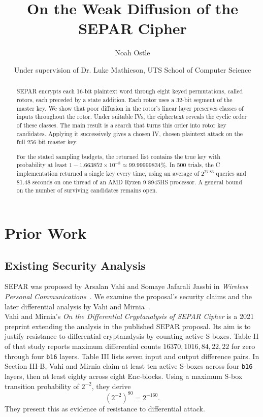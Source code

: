 \documentclass[11pt]{article}
\title{On the Weak Diffusion of the SEPAR Cipher}
\author{Noah Ostle}
\date{Under supervision of Dr. Luke Mathieson, UTS School of Computer Science}
\begin{document}
\maketitle
\begin{abstract}
	
SEPAR encrypts each 16-bit plaintext word through eight keyed permutations,
called rotors, each preceded by a state addition. Each rotor uses a 32-bit
segment of the master key. We show that poor diffusion in the rotor's linear
layer preserves classes of inputs throughout the rotor. Under suitable IVs,
the ciphertext reveals the cyclic order of these classes. The main result
is a search that turns this order into rotor key candidates. Applying it
successively gives a chosen IV, chosen plaintext attack on the full 256-bit
master key.

For the stated sampling budgets, the returned list contains the true key
with probability at least
\(1-1.663852\times10^{-8}\approx99.99999834\%\). In 500 trials, the C
implementation returned a single key every time, using an average of
\(2^{27.83}\) queries and 81.48 seconds on one thread of an AMD Ryzen 9
8945HS processor. A general bound on the number of surviving candidates
remains open.
\end{abstract}

\newpage

\section{Prior Work}\label{sec:literature}
\subsection{Existing Security Analysis}
SEPAR was proposed by Arsalan Vahi and Somaye Jafarali Jassbi in
\emph{Wireless Personal Communications}~\cite{separ}. We examine the
proposal's security claims and the later differential analysis by Vahi
and Mirnia~\cite{separ-differential}.\\

Vahi and Mirnia's \emph{On the Differential Cryptanalysis of SEPAR
Cipher} is a 2021 preprint extending the analysis in the published SEPAR proposal.
Its aim is to justify resistance to differential cryptanalysis by
counting active S-boxes. Table II of that study reports maximum
differential counts \(16370,1016,84,22,22\) for zero through four
\texttt{b16} layers. Table III lists seven input and output difference
pairs. In Section III-B, Vahi and Mirnia claim at least ten active
S-boxes across four \texttt{b16} layers, then at least eighty across
eight Enc-blocks. Using a maximum S-box transition probability of
\(2^{-2}\), they derive
\[
                         (2^{-2})^{80}=2^{-160}.
\]
They present this as evidence of resistance to differential attack.\\
\end{document}
